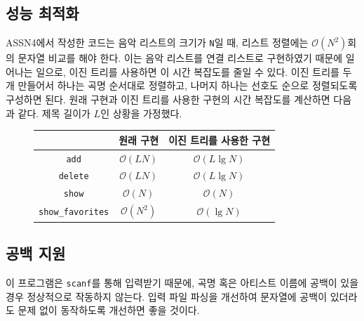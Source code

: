 \documentclass[titlepage]{article}
\begin{document}
\subsection{성능 최적화}

ASSN4에서 작성한 코드는 음악 리스트의 크기가 \texttt{N}일 때, 리스트 정렬에는 \(\mathcal{O}(N^2)\)회의 문자열 비교를 해야 한다. 이는 음악 리스트를 연결 리스트로 구현하였기 때문에 일어나는 일으로, 이진 트리를 사용하면 이 시간 복잡도를 줄일 수 있다. 이진 트리를 두 개 만들어서 하나는 곡명 순서대로 정렬하고, 나머지 하나는 선호도 순으로 정렬되도록 구성하면 된다. 원래 구현과 이진 트리를 사용한 구현의 시간 복잡도를 계산하면 다음과 같다. 제목 길이가 \(L\)인 상황을 가정했다.

\begin{figure}[H]
  \centering
  \begin{tabular}{|c|c|c|}
    \hline
                          & 원래 구현                & 이진 트리를 사용한 구현           \\
    \hline
  \texttt{add}            & \(\mathcal{O}(LN)\)  & \(\mathcal{O}(L\lg N)\) \\
  \texttt{delete}         & \(\mathcal{O}(LN)\)  & \(\mathcal{O}(L\lg N)\) \\
  \texttt{show}           & \(\mathcal{O}(N)\)   & \(\mathcal{O}(N)\)  \\
  \texttt{show\_favorites} & \(\mathcal{O}(N^2)\) & \(\mathcal{O}(\lg N)\) \\
    \hline
  \end{tabular}
\end{figure}

\subsection{공백 지원}

이 프로그램은 \texttt{scanf}를 통해 입력받기 때문에, 곡명 혹은 아티스트 이름에 공백이 있을 경우 정상적으로 작동하지 않는다. 입력 파일 파싱을 개선하여 문자열에 공백이 있더라도 문제 없이 동작하도록 개선하면 좋을 것이다.
\end{document}
